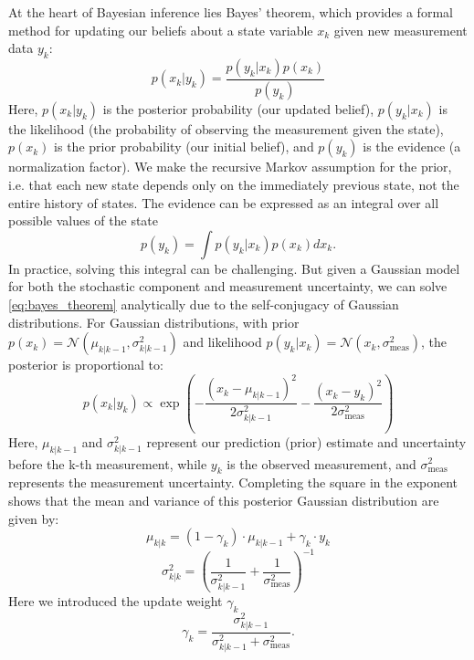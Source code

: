 \documentclass[9pt, twocolumn,superscriptaddress]{revtex4}
\begin{document}
At the heart of Bayesian inference lies Bayes' theorem, which provides a formal method for updating our beliefs about a state variable $x_k$ given new measurement data $y_k$:
\begin{equation}
p(x_k|y_k) = \frac{p(y_k|x_k)p(x_k)}{p(y_k)}
\label{eq:bayes_theorem}
\end{equation}
Here, $p(x_k|y_k)$ is the posterior probability (our updated belief), $p(y_k|x_k)$ is the likelihood (the probability of observing the measurement given the state), $p(x_k)$ is the prior probability (our initial belief), and $p(y_k)$ is the evidence (a normalization factor). We make the recursive Markov assumption for the prior, i.e. that each new state depends only on the immediately previous state, not the entire history of states. The evidence can be expressed as an integral over all possible values of the state
\begin{equation}
p(y_k) = \int p(y_k|x_k)p(x_k) dx_k.
\label{eq:evidence_integral}
\end{equation}
In practice, solving this integral can be challenging.
But given a Gaussian model for both the stochastic component and measurement uncertainty, we can solve \cref{eq:bayes_theorem} analytically due to the self-conjugacy of Gaussian distributions. For Gaussian distributions, with prior $p(x_k) = \mathcal{N}(\mu_{k|k-1}, \sigma^2_{k|k-1})$ and likelihood $p(y_k|x_k) = \mathcal{N}(x_k, \sigma^2_\text{meas})$, the posterior is proportional to:
$$p(x_k|y_k) \propto \exp\left(-\frac{(x_k-\mu_{k|k-1})^2}{2\sigma^2_{k|k-1}} - \frac{(x_k-y_k)^2}{2\sigma^2_\text{meas}}\right)$$
Here, $\mu_{k|k-1}$ and $\sigma^2_{k|k-1}$ represent our prediction (prior) estimate and uncertainty before the k-th measurement, while $y_k$ is the observed measurement, and $\sigma^2_\text{meas}$ represents the measurement uncertainty.
Completing the square in the exponent shows that the mean and variance of this posterior Gaussian distribution are given by:
\begin{equation}
\mu_{k|k} = (1-\gamma_k)\cdot\mu_{k|k-1} + \gamma_k\cdot y_k
\label{eq:posterior_mean}
\end{equation}
\begin{equation}
\sigma^2_{k|k} = \left( \frac{1}{\sigma^2_{k|k-1}} + \frac{1}{\sigma^2_\text{meas}}\right)^{-1}
\label{eq:posterior_variance}
\end{equation}
Here we introduced the update weight $\gamma_k$%
\begin{equation}
\gamma_k = \frac{\sigma^2_{k|k-1}}{\sigma^2_{k|k-1} + \sigma^2_\text{meas}}.
\label{eq:kalman_gain}
\end{equation}
\end{document}

